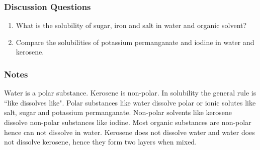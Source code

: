 \subsubsection*{Discussion Questions}
\begin{enumerate}
\item{What is the solubility of sugar, iron and salt in water and organic solvent?}
\item{Compare the solubilities of potassium permanganate and iodine in water and kerosene.}
\end{enumerate}

\subsubsection*{Notes}
Water is a polar substance. Kerosene is non-polar. In solubility the general rule is ``like dissolves like". Polar substances like water dissolve polar or ionic solutes like salt, sugar and potassium permanganate. Non-polar solvents like kerosene dissolve non-polar substances like iodine. Most organic substances are non-polar hence can not dissolve in water. Kerosene does not dissolve water and water does not dissolve kerosene, hence they form two layers when mixed.
